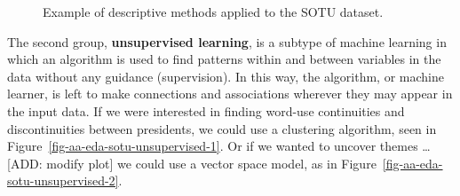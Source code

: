 \documentclass[
  letterpaper,
  DIV=11,
  numbers=noendperiod]{scrreport}
\theoremstyle{definition}
\theoremstyle{remark}
\begin{document}
\begin{figure}

\begin{minipage}[t]{0.50\linewidth}

{\centering 


}

\end{minipage}%
%
\begin{minipage}[t]{0.50\linewidth}

{\centering 


}

\end{minipage}%

\caption{\label{fig-aa-eda-sotu-descriptive}Example of descriptive
methods applied to the SOTU dataset.}

\end{figure}

The second group, \textbf{unsupervised learning}, is a subtype of
machine learning in which an algorithm is used to find patterns within
and between variables in the data without any guidance (supervision). In
this way, the algorithm, or machine learner, is left to make connections
and associations wherever they may appear in the input data. If we were
interested in finding word-use continuities and discontinuities between
presidents, we could use a clustering algorithm, seen in
Figure~\ref{fig-aa-eda-sotu-unsupervised-1}. Or if we wanted to uncover
themes \ldots{}  {[}ADD: modify plot{]} we could use a
vector space model, as in Figure~\ref{fig-aa-eda-sotu-unsupervised-2}.
\end{document}
